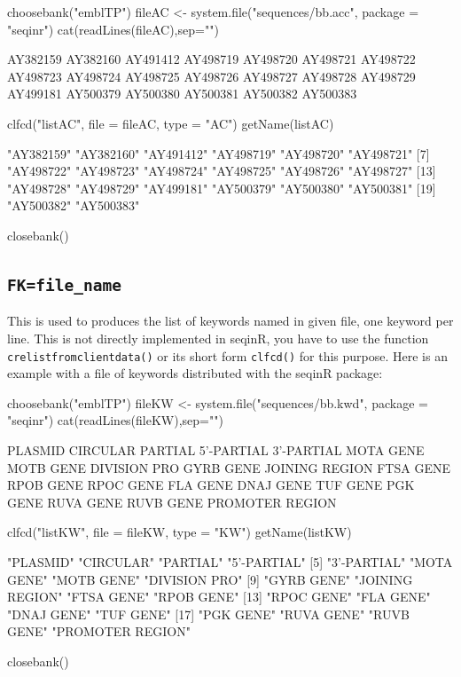 \documentclass{article}
\begin{document}
\begin{Schunk}
\begin{Sinput}
 choosebank("emblTP")
 fileAC <- system.file("sequences/bb.acc", package = "seqinr")
 cat(readLines(fileAC),sep="\n")
\end{Sinput}
\begin{Soutput}
AY382159
AY382160
AY491412
AY498719
AY498720
AY498721
AY498722
AY498723
AY498724
AY498725
AY498726
AY498727
AY498728
AY498729
AY499181
AY500379
AY500380
AY500381
AY500382
AY500383
\end{Soutput}
\begin{Sinput}
 clfcd("listAC", file = fileAC, type = "AC")
 getName(listAC)
\end{Sinput}
\begin{Soutput}
 [1] "AY382159" "AY382160" "AY491412" "AY498719" "AY498720" "AY498721"
 [7] "AY498722" "AY498723" "AY498724" "AY498725" "AY498726" "AY498727"
[13] "AY498728" "AY498729" "AY499181" "AY500379" "AY500380" "AY500381"
[19] "AY500382" "AY500383"
\end{Soutput}
\begin{Sinput}
 closebank()
\end{Sinput}
\end{Schunk}


\subsection{\texttt{FK=file\_name}}

This is used to produces the list of keywords named in given file, one keyword per line.
This is not directly implemented in seqinR, you have to use the function
\texttt{crelistfromclientdata()} or its short form \texttt{clfcd()} for this purpose. Here is an example with
a file of keywords distributed with the seqinR package:

\begin{Schunk}
\begin{Sinput}
 choosebank("emblTP")
 fileKW <- system.file("sequences/bb.kwd", package = "seqinr")
 cat(readLines(fileKW),sep="\n")
\end{Sinput}
\begin{Soutput}
PLASMID
CIRCULAR
PARTIAL
5'-PARTIAL
3'-PARTIAL
MOTA GENE
MOTB GENE
DIVISION PRO
GYRB GENE
JOINING REGION
FTSA GENE
RPOB GENE
RPOC GENE
FLA GENE
DNAJ GENE
TUF GENE
PGK GENE
RUVA GENE
RUVB GENE
PROMOTER REGION
\end{Soutput}
\begin{Sinput}
 clfcd("listKW", file = fileKW, type = "KW")
 getName(listKW) 
\end{Sinput}
\begin{Soutput}
 [1] "PLASMID"         "CIRCULAR"        "PARTIAL"         "5'-PARTIAL"     
 [5] "3'-PARTIAL"      "MOTA GENE"       "MOTB GENE"       "DIVISION PRO"   
 [9] "GYRB GENE"       "JOINING REGION"  "FTSA GENE"       "RPOB GENE"      
[13] "RPOC GENE"       "FLA GENE"        "DNAJ GENE"       "TUF GENE"       
[17] "PGK GENE"        "RUVA GENE"       "RUVB GENE"       "PROMOTER REGION"
\end{Soutput}
\begin{Sinput}
 closebank()
\end{Sinput}
\end{Schunk}
\end{document}
